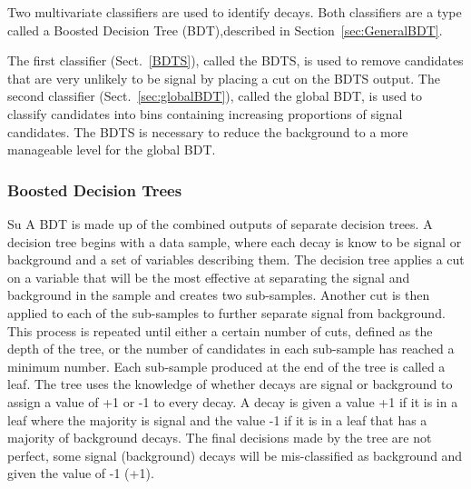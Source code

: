 Two multivariate classifiers are used to identify \bsmumu decays. Both classifiers are a type called a Boosted Decision Tree (BDT),described in Section~\ref{sec:GeneralBDT}. %

The first classifier (Sect.~\ref{BDTS}), called the BDTS, is used to remove candidates that are very unlikely to be signal by placing a cut on the BDTS output. %
The second classifier (Sect.~\ref{sec:globalBDT}), called the global BDT, is used to classify candidates into bins containing increasing proportions of signal candidates. %
The BDTS is necessary to reduce the background to a more manageable level for the global BDT.

\subsubsection{Boosted Decision Trees}
Su\label{sec:GeneralBDT}
A BDT is made up of the combined outputs of separate decision trees. A decision tree begins with a data sample, where each decay is know to be signal or background and a set of variables describing them. The decision tree applies a cut on a variable that will be the most effective at separating the signal and background in the sample and creates two sub-samples. Another cut is then applied to each of the sub-samples to further separate signal from background. This process is repeated until either a certain number of cuts, defined as the depth of the tree, or the number of candidates in each sub-sample has reached a minimum number. Each sub-sample produced at the end of the tree is called a leaf. The tree uses the knowledge of whether decays are signal or background to assign a value of +1 or -1 to every decay. A decay is given a value +1 if it is in a leaf where the majority is signal and the value -1 if it is in a leaf that has a majority of background decays. The final decisions made by the tree are not perfect, some signal (background) decays will be mis-classified as background and given the value of -1 (+1). %

